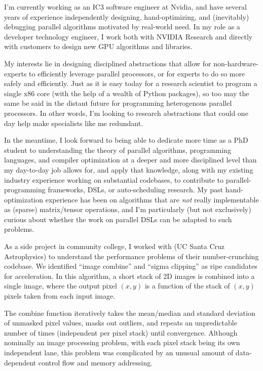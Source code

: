 


\raggedright
\reversemarginpar

I'm currently working as an IC3 software engineer at Nvidia, and have
several years of experience independently designing, hand-optimizing,
and (inevitably) debugging parallel algorithms motivated by real-world
need. In my role as a developer technology engineer, I work both with
NVIDIA Research and directly with customers to design new GPU
algorithms and libraries.

My interests lie in designing disciplined abstractions that allow for
non-hardware-experts to efficiently leverage parallel processors, or
for experts to do so more safely and efficiently. Just as it is easy
today for a research scientist to program a single x86 core (with the
help of a wealth of Python packages), so too may the same be said in
the distant future for programming heterogenous parallel
processors. In other words, I'm looking to research abstractions that
could one day help make specialists like me redundant. 

In the meantime, I look forward to being able to dedicate more time as
a PhD student to understanding the theory of parallel algorithms,
programming languages, and compiler optimization at a deeper and more
disciplined level than my day-to-day job allows for, and apply that
knowledge, along with my existing industry experience working on
substantial codebases, to contribute to parallel-programming
frameworks, DSLs, or auto-scheduling research. My past
hand-optimization experience has been on algorithms that
are \textit{not} really implementable as (sparse) matrix/tensor
operations, and I'm particularly (but not exclusively) curious about
whether the work on parallel DSLs can be adapted to such problems.

As a side project in community college, I worked
with  (UC Santa Cruz Astrophysics) to understand the performance
problems of their number-crunching codebase. We identified ``image
combine'' and ``sigma clipping'' as ripe candidates for
acceleration. In this algorithm, a short stack of 2D images is
combined into a single image, where the output pixel $(x,y)$ is a
function of the stack of $(x,y)$ pixels taken from each input image.

The combine function iteratively takes the mean/median and standard
deviation of unmasked pixel values, masks out outliers, and repeats an
unpredictable number of times (independent per pixel stack) until
convergence. Although nominally an image processing problem, with each
pixel stack being its own independent lane, this problem was
complicated by an unusual amount of data-dependent control flow and
memory addressing.

